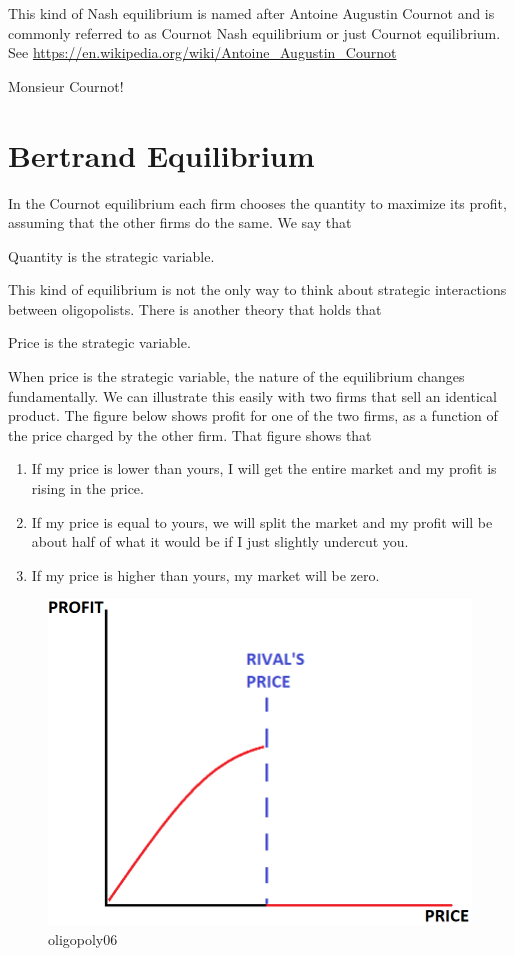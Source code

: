 \documentclass[
]{book}
\providecommand{\tightlist}{%
  \setlength{\itemsep}{0pt}\setlength{\parskip}{0pt}}
\begin{document}
This kind of Nash equilibrium is named after Antoine Augustin Cournot and is commonly referred to as Cournot Nash equilibrium or just Cournot equilibrium. See \url{https://en.wikipedia.org/wiki/Antoine_Augustin_Cournot}

Monsieur Cournot!

\hypertarget{bertrand-equilibrium}{%
\section{Bertrand Equilibrium}\label{bertrand-equilibrium}}

In the Cournot equilibrium each firm chooses the quantity to maximize its profit, assuming that the other firms do the same. We say that

\begin{center}
Quantity is the strategic variable.

\end{center}

This kind of equilibrium is not the only way to think about strategic interactions between oligopolists. There is another theory that holds that

\begin{center}
Price is the strategic variable.

\end{center}

When price is the strategic variable, the nature of the equilibrium changes fundamentally. We can illustrate this easily with two firms that sell an identical product. The figure below shows profit for one of the two firms, as a function of the price charged by the other firm. That figure shows that

\begin{enumerate}
\def\labelenumi{\arabic{enumi}.}
\tightlist
\item
  If my price is lower than yours, I will get the entire market and my profit is rising in the price.
\item
  If my price is equal to yours, we will split the market and my profit will be about half of what it would be if I just slightly undercut you.
\item
  If my price is higher than yours, my market will be zero.
\end{enumerate}

\begin{figure}

{\centering \includegraphics[width=0.5\linewidth]{img/oligopoly/fig6} 

}

\caption{oligopoly06}\label{fig:oligopoly06}
\end{figure}
\end{document}
